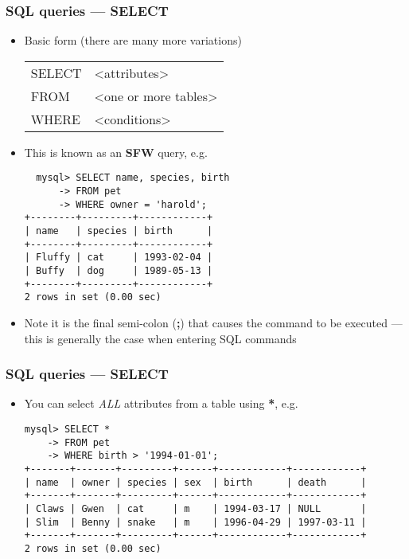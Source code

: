 \documentclass[hyperref={pdfpagelabels=false},svgnames,xcolor=table]{beamer}
\begin{document}
\begin{frame}[shrink=10, fragile]
  \frametitle{SQL queries --- SELECT}
  \begin{itemize}
    \item Basic form (there are many more variations)
      \begin{tabular}{>{\color{blue}}ll}
        SELECT & <attributes> \\
        FROM & <one or more tables> \\
        WHERE & <conditions>
      \end{tabular}
    \item This is known as an \textbf{SFW} query, e.g.\ 
  \begin{verbatim}
  mysql> SELECT name, species, birth
      -> FROM pet
      -> WHERE owner = 'harold';
+--------+---------+------------+
| name   | species | birth      |
+--------+---------+------------+
| Fluffy | cat     | 1993-02-04 |
| Buffy  | dog     | 1989-05-13 |
+--------+---------+------------+
2 rows in set (0.00 sec)
  \end{verbatim}
\item Note it is the final semi-colon (\textbf{;}) that causes the
  command to be executed --- this is generally the case when entering
  SQL commands
  \end{itemize}
\end{frame}

\begin{frame}[fragile]
  \frametitle{SQL queries --- SELECT}
  \begin{itemize}
    \item You can select \emph{ALL} attributes from a table
      using \textbf{*}, e.g.
\begin{scriptsize}
\begin{verbatim}
mysql> SELECT *
    -> FROM pet
    -> WHERE birth > '1994-01-01';
+-------+-------+---------+------+------------+------------+
| name  | owner | species | sex  | birth      | death      |
+-------+-------+---------+------+------------+------------+
| Claws | Gwen  | cat     | m    | 1994-03-17 | NULL       |
| Slim  | Benny | snake   | m    | 1996-04-29 | 1997-03-11 |
+-------+-------+---------+------+------------+------------+
2 rows in set (0.00 sec)
\end{verbatim}
\end{scriptsize}
  \end{itemize}
\end{frame}
\end{document}
